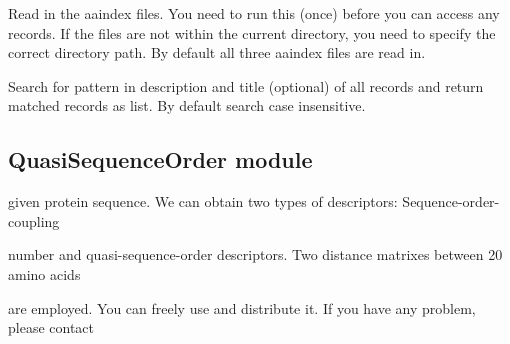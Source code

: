 \documentclass[letterpaper,10pt,english]{sphinxmanual}
\begin{document}

\begin{fulllineitems}
\label{reference/PyProteinAAIndex:PyProteinAAIndex.init}
Read in the aaindex files. You need to run this (once) before you can
access any records. If the files are not within the current directory,
you need to specify the correct directory path. By default all three
aaindex files are read in.

\end{fulllineitems}


\begin{fulllineitems}
\label{reference/PyProteinAAIndex:PyProteinAAIndex.init_from_file}
\end{fulllineitems}


\begin{fulllineitems}
\label{reference/PyProteinAAIndex:PyProteinAAIndex.search}
Search for pattern in description and title (optional) of all records and
return matched records as list. By default search case insensitive.

\end{fulllineitems}



\subsection{QuasiSequenceOrder module}
\label{reference/QuasiSequenceOrder:module-QuasiSequenceOrder}\label{reference/QuasiSequenceOrder:quasisequenceorder-module}\label{reference/QuasiSequenceOrder::doc}
given protein sequence. We can obtain two types of descriptors: Sequence-order-coupling

number and quasi-sequence-order descriptors. Two distance matrixes between 20 amino acids

are employed. You can freely use and distribute it. If you have any problem, please contact
\end{document}
